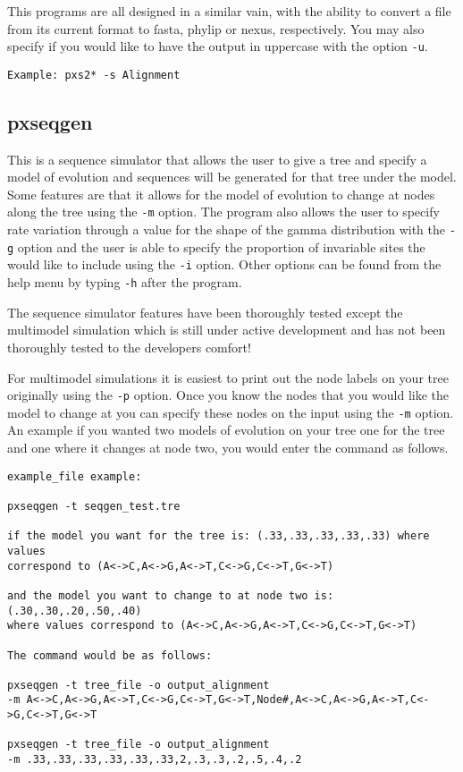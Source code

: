 \documentclass[12pt,letterpaper]{memoir}
\begin{document}
This programs are all designed in a similar vain, with the ability to convert a file from its current format to fasta, phylip or nexus, respectively. You may also specify if you would like to have the output in uppercase with the option \texttt{-u}.


\begin{flushleft}
\begin{verbatim}
Example: pxs2* -s Alignment
\end{verbatim}
\end{flushleft}

\subsection{pxseqgen}

This is a sequence simulator that allows the user to give a tree and specify a model of evolution and sequences will be generated for that tree under the model. Some features are that it allows for the model of evolution to change at nodes along the tree using the \texttt{-m} option. The program also allows the user to specify rate variation through a value for the shape of the gamma distribution with the \texttt{-g} option and the user is able to specify the proportion of invariable sites the would like to include using the \texttt{-i} option. Other options can be found from the help menu by typing \texttt{-h} after the program.

The sequence simulator features have been thoroughly tested except the multimodel simulation which is still under active development and has not been thoroughly tested to the developers comfort!

For multimodel simulations it is easiest to print out the node labels on your tree originally using the \texttt{-p} option. Once you know the nodes that you would like the model to change at you can specify these nodes on the input using the \texttt{-m} option. An example if you wanted two models of evolution on your tree one for the tree and one where it changes at node two, you would enter the command as follows.


\begin{flushleft}
\begin{verbatim}
example_file example:

pxseqgen -t seqgen_test.tre

if the model you want for the tree is: (.33,.33,.33,.33,.33) where values 
correspond to (A<->C,A<->G,A<->T,C<->G,C<->T,G<->T)

and the model you want to change to at node two is: (.30,.30,.20,.50,.40)
where values correspond to (A<->C,A<->G,A<->T,C<->G,C<->T,G<->T)

The command would be as follows: 

pxseqgen -t tree_file -o output_alignment 
-m A<->C,A<->G,A<->T,C<->G,C<->T,G<->T,Node#,A<->C,A<->G,A<->T,C<->G,C<->T,G<->T

pxseqgen -t tree_file -o output_alignment 
-m .33,.33,.33,.33,.33,.33,2,.3,.3,.2,.5,.4,.2
\end{verbatim}
\end{flushleft}
\end{document}
